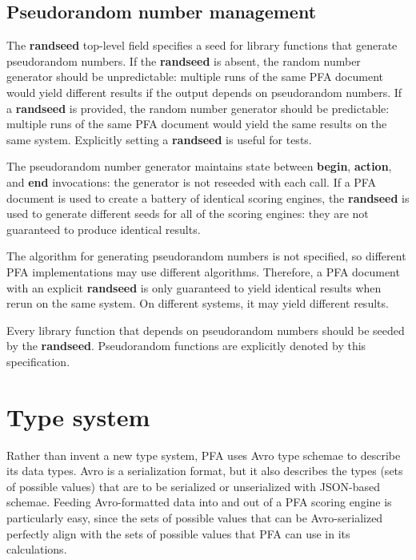 \documentclass{article}
\newcommand{\PFAc}{\ttfamily\bfseries}
\theoremstyle{definition}
\begin{document}
\hypertarget{hsec:random}{}
\subsection{Pseudorandom number management}
\label{sec:random}

The {\PFAc randseed} top-level field specifies a seed for library functions that generate pseudorandom numbers.  If the {\PFAc randseed} is absent, the random number generator should be unpredictable: multiple runs of the same PFA document would yield different results if the output depends on pseudorandom numbers.  If a {\PFAc randseed} is provided, the random number generator should be predictable: multiple runs of the same PFA document would yield the same results on the same system.  Explicitly setting a {\PFAc randseed} is useful for tests.

The pseudorandom number generator maintains state between {\PFAc begin}, {\PFAc action}, and {\PFAc end} invocations: the generator is not reseeded with each call.  If a PFA document is used to create a battery of identical scoring engines, the {\PFAc randseed} is used to generate different seeds for all of the scoring engines: they are not guaranteed to produce identical results.

The algorithm for generating pseudorandom numbers is not specified, so different PFA implementations may use different algorithms.  Therefore, a PFA document with an explicit {\PFAc randseed} is only guaranteed to yield identical results when rerun on the same system.  On different systems, it may yield different results.

Every library function that depends on pseudorandom numbers should be seeded by the {\PFAc randseed}.  Pseudorandom functions are explicitly denoted by this specification.

\pagebreak

\section{Type system}

Rather than invent a new type system, PFA uses Avro type schemae to describe its data types.  Avro is a serialization format, but it also describes the types (sets of possible values) that are to be serialized or unserialized with JSON-based schemae.  Feeding Avro-formatted data into and out of a PFA scoring engine is particularly easy, since the sets of possible values that can be Avro-serialized perfectly align with the sets of possible values that PFA can use in its calculations.
\end{document}
